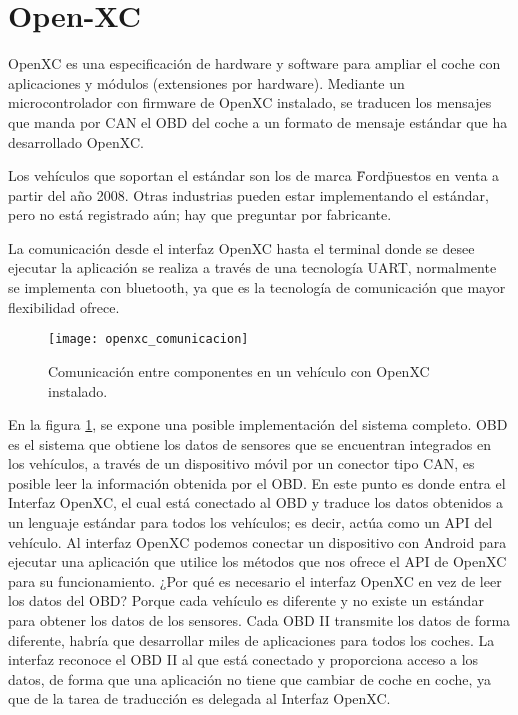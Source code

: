 \section{Open-XC}\label{apendice:open-xc}
OpenXC es una especificación de hardware y software para ampliar el coche con
aplicaciones y módulos (extensiones por hardware). Mediante un microcontrolador
con firmware de OpenXC instalado, se traducen los mensajes que manda por CAN
el OBD del coche a un formato de mensaje estándar que ha desarrollado OpenXC.

Los vehículos que soportan el estándar son los de marca \"Ford\" puestos
en venta a partir del año 2008. Otras industrias pueden estar implementando el 
estándar, pero no está registrado aún; hay que preguntar por fabricante.

La comunicación desde el interfaz OpenXC hasta el terminal donde se desee ejecutar
la aplicación se realiza a través de una tecnología UART, normalmente se implementa
con bluetooth, ya que es la tecnología de comunicación que mayor flexibilidad ofrece.

\begin{figure}[H]
	\begin{center}
		\texttt{[image: openxc\_comunicacion]}
		\caption{Comunicación entre componentes en un vehículo con OpenXC instalado.}
		\label{fig:openxc_comunicacion}
	\end{center}
\end{figure}


En la figura \ref{fig:openxc_comunicacion}, se expone una posible implementación del sistema
completo. OBD es el sistema que obtiene los datos de sensores que se encuentran integrados en
los vehículos, a través de un dispositivo móvil por un conector tipo CAN, es posible leer la
información obtenida por el OBD. En este punto es donde entra el Interfaz OpenXC, el cual está
conectado al OBD y traduce los datos obtenidos a un lenguaje estándar para todos los vehículos;
es decir, actúa como un API del vehículo. Al interfaz OpenXC podemos conectar un dispositivo
con Android para ejecutar una aplicación que utilice los métodos que nos ofrece el API de
OpenXC para su funcionamiento. ¿Por qué es necesario el interfaz OpenXC en vez de leer los
datos del OBD? Porque cada vehículo es diferente y no existe un estándar para obtener los datos
de los sensores. Cada OBD II transmite los datos de forma diferente, habría que desarrollar
miles de aplicaciones para todos los coches. La interfaz reconoce el OBD II al que está
conectado y proporciona acceso a los datos, de forma que una aplicación no tiene que cambiar
de coche en coche, ya que de la tarea de traducción es delegada al Interfaz OpenXC.

